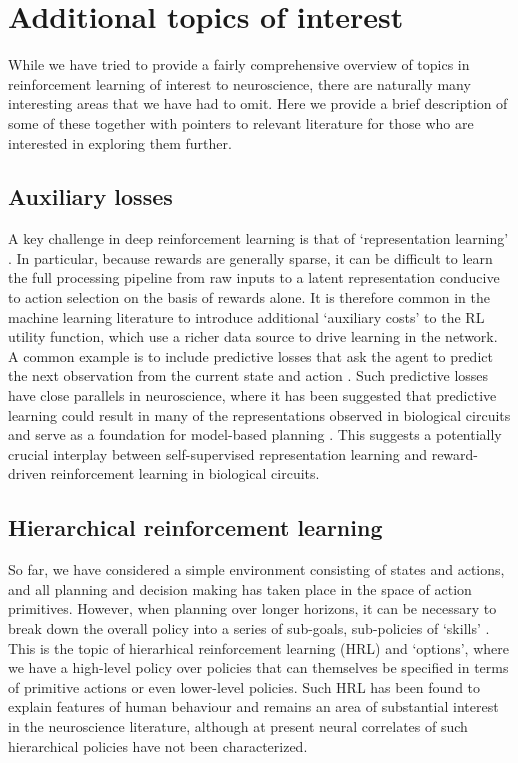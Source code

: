 \section{Additional topics of interest}
\label{sec:additional}

While we have tried to provide a fairly comprehensive overview of topics in reinforcement learning of interest to neuroscience, there are naturally many interesting areas that we have had to omit.
Here we provide a brief description of some of these together with pointers to relevant literature for those who are interested in exploring them further.

\subsection{Auxiliary losses}
\label{sec:auxiliary}
A key challenge in deep reinforcement learning is that of `representation learning' \citep{botvinick2020deep}.
In particular, because rewards are generally sparse, it can be difficult to learn the full processing pipeline from raw inputs to a latent representation conducive to action selection on the basis of rewards alone.
It is therefore common in the machine learning literature to introduce additional `auxiliary costs' to the RL utility function, which use a richer data source to drive learning in the network.
A common example is to include predictive losses that ask the agent to predict the next observation from the current state and action \citep{jaderberg2016reinforcement, zintgraf2019varibad}.
Such predictive losses have close parallels in neuroscience, where it has been suggested that predictive learning could result in many of the representations observed in biological circuits \citep{rao1999predictive, stachenfeld2017hippocampus, whittington2020tolman, blanco2021dopamine} and serve as a foundation for model-based planning \citep{jensen2023recurrent}.
This suggests a potentially crucial interplay between self-supervised representation learning and reward-driven reinforcement learning in biological circuits.

\subsection{Hierarchical reinforcement learning}
\label{sec:HRL}
So far, we have considered a simple environment consisting of states and actions, and all planning and decision making has taken place in the space of action primitives.
However, when planning over longer horizons, it can be necessary to break down the overall policy into a series of sub-goals, sub-policies of `skills' \citep{sutton1999between, pateria2021hierarchical}.
This is the topic of hierarhical reinforcement learning (HRL) and `options', where we have a high-level policy over policies that can themselves be specified in terms of primitive actions or even lower-level policies.
Such HRL has been found to explain features of human behaviour \citep{eckstein2020computational,botvinick2008hierarchical,botvinick2009hierarchically} and remains an area of substantial interest in the neuroscience literature, although at present neural correlates of such hierarchical policies have not been characterized.

